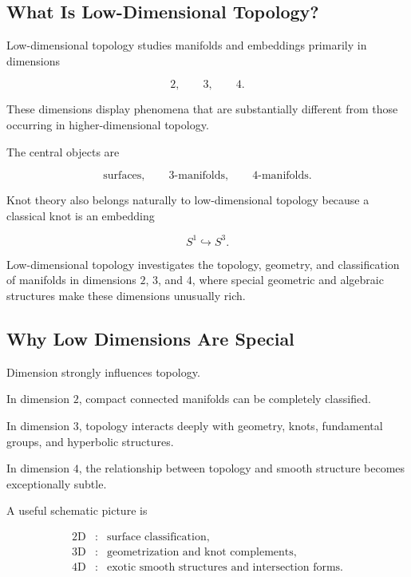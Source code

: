 \subsection{What Is Low-Dimensional Topology?}
\label{subsec:what-is-low-dimensional-topology}

Low-dimensional topology studies manifolds and embeddings primarily in
dimensions

\[
\boxed{
2,\qquad3,\qquad4.
}
\]

These dimensions display phenomena that are substantially different from
those occurring in higher-dimensional topology.

The central objects are

\[
\boxed{
\text{surfaces},
\qquad
3\text{-manifolds},
\qquad
4\text{-manifolds}.
}
\]

Knot theory also belongs naturally to low-dimensional topology because a
classical knot is an embedding

\[
S^1\hookrightarrow S^3.
\]

\begin{conceptbox}
Low-dimensional topology investigates the topology, geometry, and
classification of manifolds in dimensions \(2\), \(3\), and \(4\), where
special geometric and algebraic structures make these dimensions unusually
rich.
\end{conceptbox}

\subsection{Why Low Dimensions Are Special}
\label{subsec:why-low-dimensions-special}

Dimension strongly influences topology.

In dimension \(2\), compact connected manifolds can be completely
classified.

In dimension \(3\), topology interacts deeply with geometry, knots,
fundamental groups, and hyperbolic structures.

In dimension \(4\), the relationship between topology and smooth structure
becomes exceptionally subtle.

A useful schematic picture is

\[
\boxed{
\begin{array}{ccl}
2\text{D} &:& \text{surface classification},\\[2mm]
3\text{D} &:& \text{geometrization and knot complements},\\[2mm]
4\text{D} &:& \text{exotic smooth structures and intersection forms}.
\end{array}
}
\]


